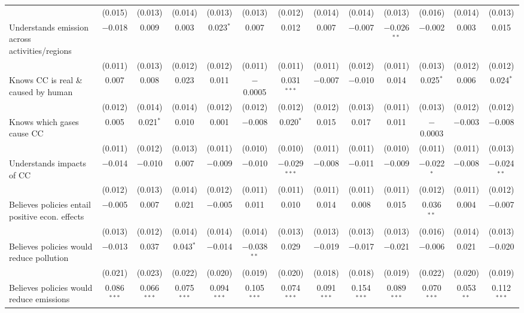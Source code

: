 \begin{tabular}{@{\extracolsep{5pt}}lcccccccccccc}
  & (0.015) & (0.013) & (0.014) & (0.013) & (0.013) & (0.012) & (0.014) & (0.014) & (0.013) & (0.016) & (0.014) & (0.013) \\ 
  Understands emission across activities/regions & $-$0.018 & 0.009 & 0.003 & 0.023$^{*}$ & 0.007 & 0.012 & 0.007 & $-$0.007 & $-$0.026$^{**}$ & $-$0.002 & 0.003 & 0.015 \\ 
  & (0.011) & (0.013) & (0.012) & (0.012) & (0.011) & (0.011) & (0.011) & (0.012) & (0.011) & (0.013) & (0.012) & (0.012) \\ 
  Knows CC is real \& caused by human & 0.007 & 0.008 & 0.023 & 0.011 & $-$0.0005 & 0.031$^{***}$ & $-$0.007 & $-$0.010 & 0.014 & 0.025$^{*}$ & 0.006 & 0.024$^{*}$ \\ 
  & (0.012) & (0.014) & (0.014) & (0.012) & (0.012) & (0.012) & (0.012) & (0.013) & (0.011) & (0.013) & (0.012) & (0.012) \\ 
  Knows which gases cause CC & 0.005 & 0.021$^{*}$ & 0.010 & 0.001 & $-$0.008 & 0.020$^{*}$ & 0.015 & 0.017 & 0.011 & $-$0.0003 & $-$0.003 & $-$0.008 \\ 
  & (0.011) & (0.012) & (0.013) & (0.011) & (0.010) & (0.010) & (0.011) & (0.011) & (0.010) & (0.011) & (0.011) & (0.013) \\ 
  Understands impacts of CC & $-$0.014 & $-$0.010 & 0.007 & $-$0.009 & $-$0.010 & $-$0.029$^{***}$ & $-$0.008 & $-$0.011 & $-$0.009 & $-$0.022$^{*}$ & $-$0.008 & $-$0.024$^{**}$ \\ 
  & (0.012) & (0.013) & (0.014) & (0.012) & (0.011) & (0.011) & (0.011) & (0.011) & (0.011) & (0.012) & (0.011) & (0.012) \\ 
  Believes policies entail positive econ. effects & $-$0.005 & 0.007 & 0.021 & $-$0.005 & 0.011 & 0.010 & 0.014 & 0.008 & 0.015 & 0.036$^{**}$ & 0.004 & $-$0.007 \\ 
  & (0.013) & (0.012) & (0.014) & (0.014) & (0.014) & (0.013) & (0.013) & (0.013) & (0.013) & (0.016) & (0.014) & (0.013) \\ 
  Believes policies would reduce pollution & $-$0.013 & 0.037 & 0.043$^{*}$ & $-$0.014 & $-$0.038$^{**}$ & 0.029 & $-$0.019 & $-$0.017 & $-$0.021 & $-$0.006 & 0.021 & $-$0.020 \\ 
  & (0.021) & (0.023) & (0.022) & (0.020) & (0.019) & (0.020) & (0.018) & (0.018) & (0.019) & (0.022) & (0.020) & (0.019) \\ 
  Believes policies would reduce emissions & 0.086$^{***}$ & 0.066$^{***}$ & 0.075$^{***}$ & 0.094$^{***}$ & 0.105$^{***}$ & 0.074$^{***}$ & 0.091$^{***}$ & 0.154$^{***}$ & 0.089$^{***}$ & 0.070$^{***}$ & 0.053$^{**}$ & 0.112$^{***}$ \\ 

\end{tabular}
